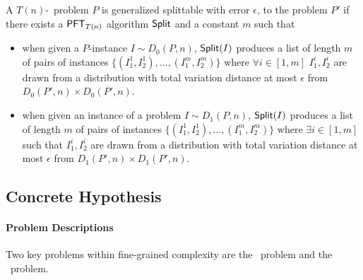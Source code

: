 \begin{definition}
	A $T(n)$-\ACIH~problem $P$ is generalized splittable with error $\epsilon$, to the problem $P'$ if there exists a $\mathsf{PFT}_{T(n)}$ algorithm $\mathsf{Split}$ and a constant $m$ such that
	\begin{itemize}
		\item when given a $P$-instance $I \sim D_{0}(P,n)$, $\mathsf{Split}(I)$ produces a list of length $m$ of pairs of instances  $\{(I_1^1,I_2^1),\ldots,(I_1^m,I_2^m)\}$ where  $\forall i\in [1,m]$ $I_1^i,I_2^i$ are drawn from a distribution with total variation distance at most $\epsilon$ from $D_{0}(P',n)\times D_0(P',n)$.
		\item when given an instance of a problem $I \sim D_{1}(P,n)$, $\mathsf{Split}(I)$ produces a list of length $m$ of pairs of instances  $\{(I_1^1,I_2^1),\ldots,(I_1^m,I_2^m)\}$ where $\exists i\in[1,m]$ such that $I_1^i,I_2^i$ are drawn from a distribution with total variation distance at most $\epsilon$ from $D_{1}(P',n)\times D_1(P',n)$.
	\end{itemize}
\end{definition}



\subsection {Concrete Hypothesis}

\paragraph{Problem Descriptions}
Two key problems within fine-grained complexity are the \kSum~problem and the \zkclique~problem. 

